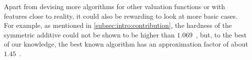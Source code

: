 %
Apart from devising more algorithms for other valuation functions or with features close to reality, it could also be rewarding to look at more basic cases.
For example, as mentioned in \cref{subsec:intro:contribution}, the hardness of the symmetric additive \NSW{} could not be shown to be higher than \(1.069\)~\cite{satiation_in_fisher_markets_and_approx_of_nsw}, but, to the best of our knowledge, the best known algorithm has an approximation factor of about \(1.45\)~\cite{finding_fair_and_efficient_allocs}.





